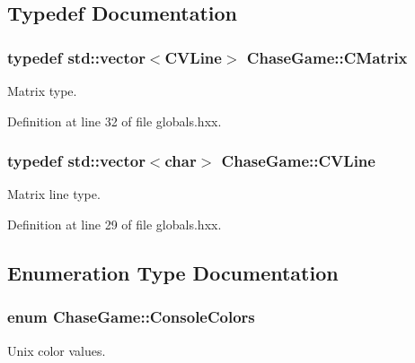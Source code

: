 \subsection{Typedef Documentation}
\hypertarget{namespace_chase_game_a469449f9237e59efce3982127366c550}{
\subsubsection[{C\-Matrix}]{\setlength{\rightskip}{0pt plus 5cm}typedef std\-::vector$<${\bf C\-V\-Line}$>$ {\bf Chase\-Game\-::\-C\-Matrix}}}\label{namespace_chase_game_a469449f9237e59efce3982127366c550}


Matrix type. 



Definition at line 32 of file globals.\-hxx.

\hypertarget{namespace_chase_game_aa09cf1806d3b1f59d36cfabadeaca6a2}{
\subsubsection[{C\-V\-Line}]{\setlength{\rightskip}{0pt plus 5cm}typedef std\-::vector$<$char$>$ {\bf Chase\-Game\-::\-C\-V\-Line}}}\label{namespace_chase_game_aa09cf1806d3b1f59d36cfabadeaca6a2}


Matrix line type. 



Definition at line 29 of file globals.\-hxx.



\subsection{Enumeration Type Documentation}
\hypertarget{namespace_chase_game_a5acdf639e912d1e78814b7fae21afc7b}{
\subsubsection[{Console\-Colors}]{\setlength{\rightskip}{0pt plus 5cm}enum {\bf Chase\-Game\-::\-Console\-Colors}}}\label{namespace_chase_game_a5acdf639e912d1e78814b7fae21afc7b}


Unix color values. 

